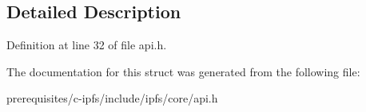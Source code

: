 \subsection{Detailed Description}


Definition at line 32 of file api.\+h.



The documentation for this struct was generated from the following file\+:\begin{DoxyCompactItemize}
\item 
prerequisites/c-\/ipfs/include/ipfs/core/api.\+h\end{DoxyCompactItemize}
